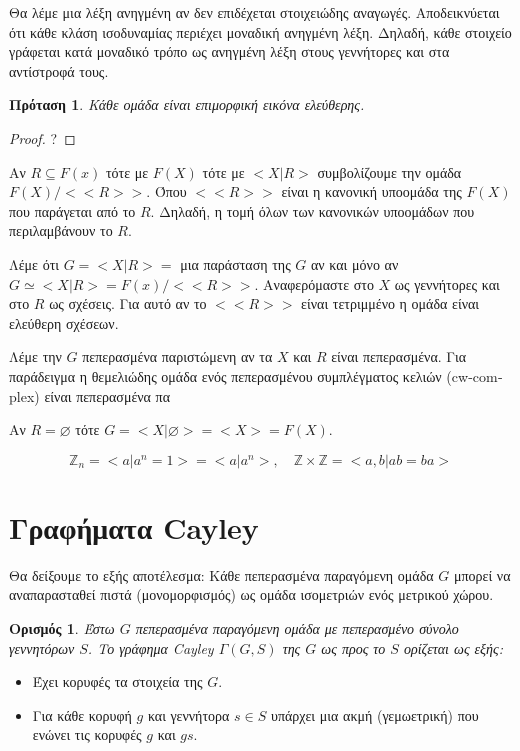 \documentclass[oneside,a4paper]{article}
\newtheorem*{defn}{Ορισμός}
\newtheorem{prop}{Πρόταση}
\newcommand {\tl}{\textlatin}
\newcommand{\Z}{\mathbb{Z}}
\begin{document}
\noindent Θα λέμε μια λέξη ανηγμένη αν δεν επιδέχεται στοιχειώδης αναγωγές. Αποδεικνύεται ότι κάθε κλάση ισοδυναμίας περιέχει μοναδική ανηγμένη λέξη. Δηλαδή, κάθε στοιχείο γράφεται κατά μοναδικό τρόπο ως ανηγμένη λέξη στους γεννήτορες και στα αντίστροφά τους.

\begin{prop}
	Κάθε ομάδα είναι επιμορφική εικόνα ελεύθερης.
\end{prop}

\begin{proof}
	?
\end{proof}


\noindent Αν $R \subseteq F(x)$ τότε με $F(X)$ τότε με $<X| R>$ συμβολίζουμε την ομάδα $F(X)/<<R>>$. Όπου $<<R>>$ είναι η κανονική υποομάδα της $F(X)$ που παράγεται από το $R$. Δηλαδή, η τομή όλων των κανονικών υποομάδων που περιλαμβάνουν το $R$.


\noindent Λέμε ότι $G = <X|R> = $ μια παράσταση της $G$ αν και μόνο αν $G \simeq <X|R> = F(x)/<<R>>$. Αναφερόμαστε στο $X$ ως γεννήτορες και στο $R$ ως σχέσεις. Για αυτό αν το $<<R>>$ είναι τετριμμένο η ομάδα είναι ελεύθερη σχέσεων.


\noindent Λέμε την $G$ πεπερασμένα παριστώμενη αν τα $X$ και $R$ είναι πεπερασμένα. Για παράδειγμα η θεμελιώδης ομάδα ενός πεπερασμένου συμπλέγματος κελιών (\tl{cw-complex}) είναι πεπερασμένα πα


\noindent Αν $R= \varnothing$ τότε $G = <X|\varnothing> = <X> = F(X)$.

$$\Z_n = <a| a^n = 1> = <a| a^n>, \quad \Z \times \Z = <a,b| ab=ba>$$

\section{ Γραφήματα \tl{Cayley}}

\noindent Θα δείξουμε το εξής αποτέλεσμα: Κάθε πεπερασμένα παραγόμενη ομάδα $G$ μπορεί να αναπαρασταθεί πιστά (μονομορφισμός) ως ομάδα ισομετριών ενός μετρικού χώρου.

\begin{defn}
	Έστω $G$ πεπερασμένα παραγόμενη ομάδα με πεπερασμένο σύνολο γεννητόρων $S$. Το γράφημα \tl{Cayley} $\Gamma(G,S)$ της $G$ ως προς το $S$ ορίζεται ως εξής:
\end{defn}

\begin{itemize}
	\item Έχει κορυφές τα στοιχεία της $G$.
	\item Για κάθε κορυφή $g$ και γεννήτορα $s \in S$ υπάρχει μια ακμή (γεμωετρική) που ενώνει τις κορυφές $g$ και $gs$.
\end{itemize}
\end{document}
